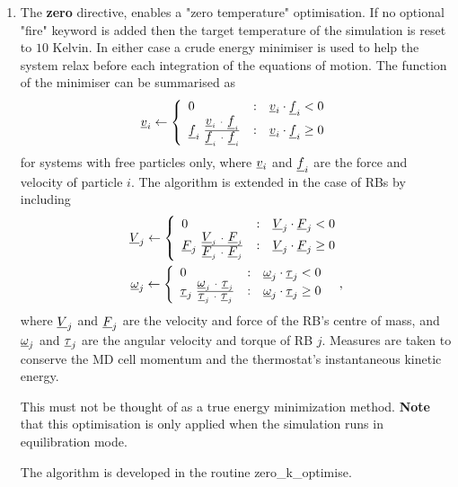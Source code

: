 \begin{enumerate}
\item The {\bf zero} directive, enables a "zero temperature"
optimisation.  If no optional "fire" keyword is added then the
target temperature of the simulation is reset to $10$ Kelvin.
In either case a crude energy minimiser is used to help the
system relax before each integration of the equations of motion.
The function of the minimiser can be summarised as
\begin{equation}
\vek{v}_{i} \leftarrow \left\{ \begin{array} {l@{\quad:\quad}l}
0 & \vek{v}_{i} \cdot \vek{f}_{i} < 0 \\
\vek{f}_{i} \; \frac{\vek{v}_{i}~\cdot~\vek{f}_{i}}
{\vek{f}_{i}~\cdot~\vek{f}_{i}} & \vek{v}_{i} \cdot
\vek{f}_{i} \ge 0
\end{array} \right.
\end{equation}
for systems with free particles only, where $\mbox{$\underline{v}$}_{i}$ and
$\mbox{$\underline{f}$}_{i}$ are the force and velocity of particle $i$.  The
algorithm is extended in the case of RBs by including
\begin{eqnarray}
\vek{V}_{j} \leftarrow \left\{ \begin{array} {l@{\quad:\quad}l}
0 & \vek{V}_{j} \cdot \vek{F}_{j} < 0 \\
\vek{F}_{j} \; \frac{\vek{V}_{j}~\cdot~\vek{F}_{j}}
{\vek{F}_{j}~\cdot~\vek{F}_{j}} & \vek{V}_{j} \cdot
\vek{F}_{j} \ge 0
\end{array} \right. \\ \nonumber
\vek{\omega}_{j} \leftarrow \left\{ \begin{array} {l@{\quad:\quad}l}
0 & \vek{\omega}_{j} \cdot \vek{\tau}_{j} < 0 \\
\vek{\tau}_{j} \; \frac{\vek{\omega}_{j}~\cdot~\vek{\tau}_{j}}
{\vek{\tau}_{j}~\cdot~\vek{\tau}_{j}} & \vek{\omega}_{j} \cdot
\vek{\tau}_{j} \ge 0
\end{array} \right.~~,
\end{eqnarray}
where $\mbox{$\underline{V}$}_{j}$ and $\mbox{$\underline{F}$}_{j}$ are the velocity and
force of the RB's centre of mass, and $\mbox{$\underline{\omega}$}_{j}$ and
$\mbox{$\underline{\tau}$}_{j}$ are the angular velocity and torque of RB $j$.
Measures are taken to conserve the MD cell momentum and the
thermostat's instantaneous kinetic energy.

This must not be thought of as a true energy minimization
method.  {\bf Note} that this optimisation is only applied
when the simulation runs in equilibration mode.

The algorithm is developed in the \D routine {\sc zero\_k\_optimise}.


\end{enumerate}
